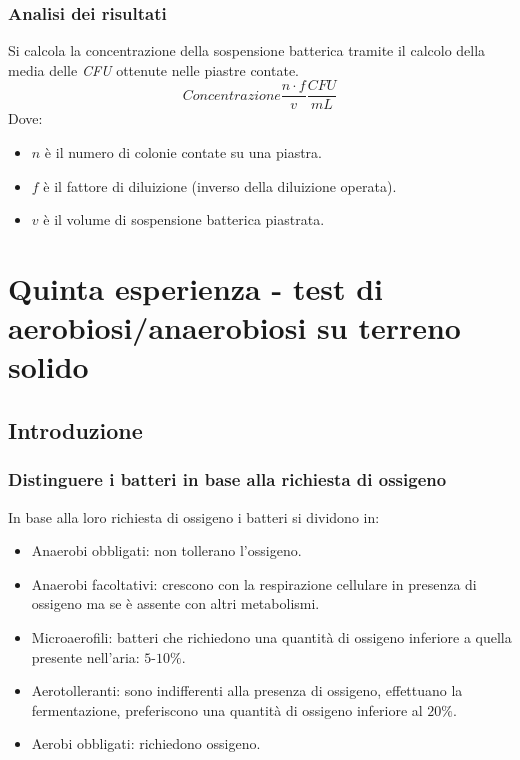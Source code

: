 		\subsubsection{Analisi dei risultati}
		Si calcola la concentrazione della sospensione batterica tramite il calcolo della media delle \emph{CFU} ottenute nelle piastre contate.
		\[Concentrazione \dfrac{n\cdot f}{v}\dfrac{CFU}{\si{mL}}\]
		Dove:
		\begin{multicols}{3}
			\begin{itemize}
				\item $n$ \`e il numero di colonie contate su una piastra.
				\item $f$ \`e il fattore di diluizione (inverso della diluizione operata).
				\item $v$ \`e il volume di sospensione batterica piastrata.
			\end{itemize}
		\end{multicols}

\section{Quinta esperienza - test di aerobiosi/anaerobiosi su terreno solido}

	\subsection{Introduzione}

		\subsubsection{Distinguere i batteri in base alla richiesta di ossigeno}
		In base alla loro richiesta di ossigeno i batteri si dividono in:
		\begin{multicols}{2}
			\begin{itemize}
				\item Anaerobi obbligati: non tollerano l'ossigeno.
				\item Anaerobi facoltativi: crescono con la respirazione cellulare in presenza di ossigeno ma se \`e assente con altri metabolismi.
				\item Microaerofili: batteri che richiedono una quantit\`a di ossigeno inferiore a quella presente nell'aria: $5$-$10\%$.
				\item Aerotolleranti: sono indifferenti alla presenza di ossigeno, effettuano la fermentazione, preferiscono una quantit\`a di ossigeno inferiore al $20\%$.
				\item Aerobi obbligati: richiedono ossigeno.
			\end{itemize}
		\end{multicols}


